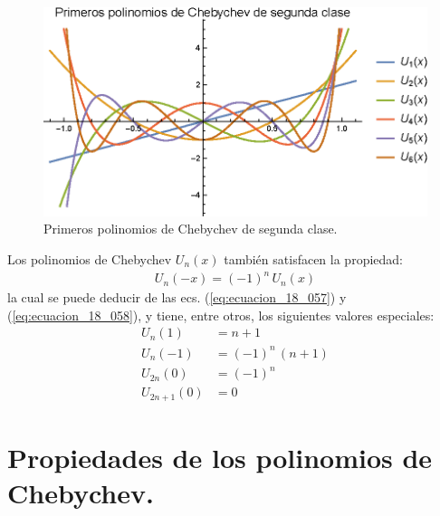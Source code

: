 \begin{figure}[H]
    \centering
    \includegraphics[scale=1]{Imagenes/Plot_Polinomios_Chebychev_02.eps}
    \caption{Primeros polinomios de Chebychev de segunda clase.}
    \label{fig:figura_plot_chebychev_02}
\end{figure}
Los polinomios de Chebychev $U_{n}(x)$ también satisfacen la propiedad:
\begin{align*}
U_{n} (-x) = (-1)^{n} \, U_{n} (x)
\end{align*}
la cual se puede deducir de las ecs. (\ref{eq:ecuacion_18_057}) y (\ref{eq:ecuacion_18_058}), y tiene, entre otros, los siguientes valores especiales:
\begin{align*}
U_{n} (1) &= n + 1 \\[0.5em]
U_{n} (-1) &= (-1)^{n} \, (n + 1) \\[0.5em]
U_{2n} (0) &= (-1)^{n} \\[0.5em]
U_{2n+1} (0) &= 0
\end{align*}

\section{Propiedades de los polinomios de Chebychev.}

